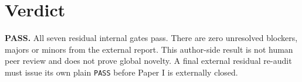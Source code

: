 \documentclass[11pt]{article}
\begin{document}
\section{Verdict}
\textbf{PASS.} All seven residual internal gates pass. There are zero unresolved
blockers, majors or minors from the external report. This author-side result is
not human peer review and does not prove global novelty. A final external
residual re-audit must issue its own plain \texttt{PASS} before Paper I is
externally closed.
\end{document}
